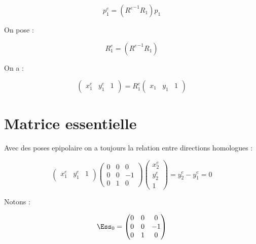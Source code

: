 \begin{equation}
     p^e_1 = ({R^e }^{-1} R_1)  p_1
\end{equation}

On pose   :

\begin{equation}
      R^e_1= ({R^e }^{-1} R_1) 
\end{equation}

On a :

\begin{equation}
\label{CEpiCnorm}
     \begin{pmatrix} x^e_1 &  y^e_1  &  1 \end{pmatrix} 
     = R^e_1 \begin{pmatrix} x_1 &  y_1  &  1 \end{pmatrix}
\end{equation}



\section{Matrice essentielle}

Avec des poses
epipolaire on a toujours la relation  entre directions
homologues :

\begin{equation}
      \begin{pmatrix} x^e_1 &  y^e_1  &  1 \end{pmatrix}
      \begin{pmatrix} 0 & 0 & 0 \\ 0 & 0 & -1   \\  0 & 1 & 0 \end{pmatrix}
      \begin{pmatrix} x^e_2 \\  y^e_2  \\  1 \end{pmatrix}
      =   y^e_2 - y^e_1 
      = 0
 \end{equation}

Notons :

\begin{equation}
      \Ess_0 =
      \begin{pmatrix} 0 & 0 & 0 \\ 0 & 0 & -1   \\  0 & 1 & 0 \end{pmatrix}
 \end{equation}


